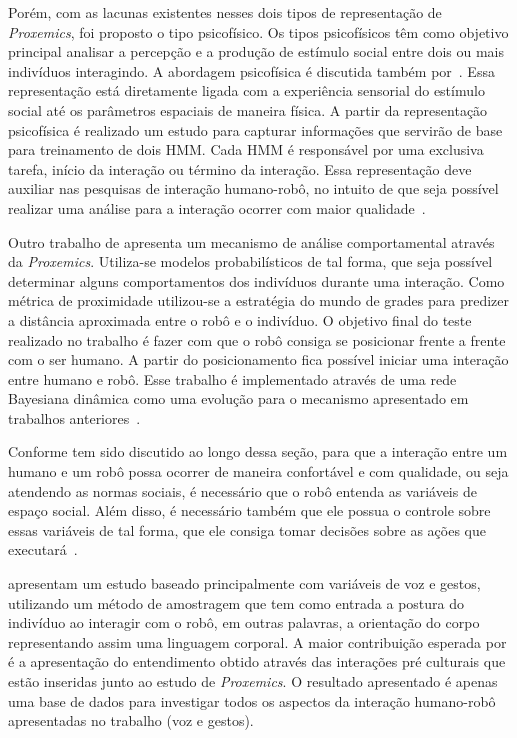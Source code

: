 Porém, com as lacunas existentes nesses dois tipos de representação de \emph{Proxemics}, foi proposto o tipo psicofísico. Os tipos psicofísicos têm como objetivo principal analisar a percepção e a produção de estímulo social entre dois ou mais indivíduos interagindo. A abordagem psicofísica é discutida também por~\textcite{hall:1969}. Essa representação está diretamente ligada com a experiência sensorial do estímulo social até os parâmetros espaciais de maneira física. A partir da representação psicofísica é realizado um estudo para capturar informações que servirão de base para treinamento de dois HMM. Cada HMM é responsável por uma exclusiva tarefa, início da interação ou término da interação. Essa representação deve auxiliar nas pesquisas de interação humano-robô, no intuito de que seja possível realizar uma análise para a interação ocorrer com maior qualidade~\cite{mead:2012}.

Outro trabalho de \textcite{mead:2012b} apresenta um mecanismo de análise comportamental através da \emph{Proxemics}. Utiliza-se modelos probabilísticos de tal forma, que seja possível determinar alguns comportamentos dos indivíduos durante uma interação. Como métrica de proximidade utilizou-se a estratégia do mundo de grades para predizer a distância aproximada entre o robô e o indivíduo. O objetivo final do teste realizado no trabalho é fazer com que o robô consiga se posicionar frente a frente com o ser humano. A partir do posicionamento fica possível iniciar uma interação entre humano e robô. Esse trabalho é implementado através de uma rede Bayesiana dinâmica como uma evolução para o mecanismo apresentado em trabalhos anteriores~\cite{mead:2012b}.

Conforme tem sido discutido ao longo dessa seção, para que a interação entre um humano e um robô possa ocorrer de maneira confortável e com qualidade, ou seja atendendo as normas sociais, é necessário que o robô entenda as variáveis de espaço social. Além disso, é necessário também que ele possua o controle sobre essas variáveis de tal forma, que ele consiga tomar decisões sobre as ações que executará~\cite{mead:2013b}.

\textcite{mead:2013b} apresentam um estudo baseado principalmente com variáveis de voz e gestos, utilizando um método de amostragem que tem como entrada a postura do indivíduo ao interagir com o robô, em outras palavras, a orientação do corpo representando assim uma linguagem corporal. A maior contribuição esperada por \textcite{mead:2013b} é a apresentação do entendimento obtido através das interações pré culturais que estão inseridas junto ao estudo de \emph{Proxemics}. O resultado apresentado é apenas uma base de dados para investigar todos os aspectos da interação humano-robô apresentadas no trabalho (voz e gestos).

